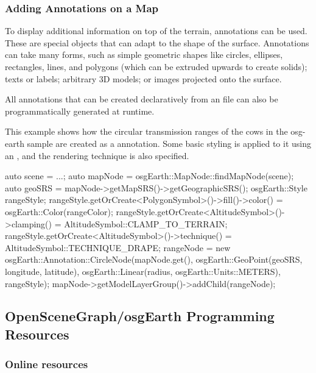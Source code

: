 \subsubsection{Adding Annotations on a Map}
\label{sec:graphics:osgearth-adding-annotations}

To display additional information on top of the terrain, annotations can be
used. These are special objects that can adapt to the shape of the surface.
Annotations can take many forms, such as simple geometric shapes like circles,
ellipses, rectangles, lines, and polygons (which can be extruded upwards to
create solids); texts or labels; arbitrary 3D models; or images projected onto
the surface.

All annotations that can be created declaratively from an  file can also
be programmatically generated at runtime.

This example shows how the circular transmission ranges of the cows in the
osg-earth sample are created as a 
annotation. Some basic styling is applied to it using an
, and the rendering technique is also specified.

\begin{cpp}
auto scene = ...;
auto mapNode = osgEarth::MapNode::findMapNode(scene);
auto geoSRS = mapNode->getMapSRS()->getGeographicSRS();
osgEarth::Style rangeStyle;
rangeStyle.getOrCreate<PolygonSymbol>()->fill()->color() =
                                        osgEarth::Color(rangeColor);
rangeStyle.getOrCreate<AltitudeSymbol>()->clamping() =
                                        AltitudeSymbol::CLAMP_TO_TERRAIN;
rangeStyle.getOrCreate<AltitudeSymbol>()->technique() =
                                        AltitudeSymbol::TECHNIQUE_DRAPE;
rangeNode = new osgEarth::Annotation::CircleNode(mapNode.get(),
    osgEarth::GeoPoint(geoSRS, longitude, latitude),
    osgEarth::Linear(radius, osgEarth::Units::METERS), rangeStyle);
mapNode->getModelLayerGroup()->addChild(rangeNode);
\end{cpp}


\subsection{OpenSceneGraph/osgEarth Programming Resources}
\label{sec:graphics:osg-osgearth-programming-resources}

\subsubsection{Online resources}
\label{sec:graphics:osg-osgearth-online-resources}

